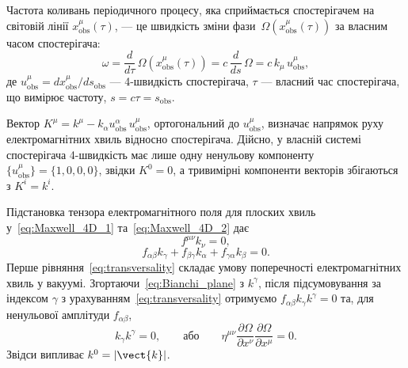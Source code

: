 Частота коливань періодичного процесу, яка сприймається спостерігачем на світовій лінії $x_{\text{obs}}^{\mu}(\tau)$, --- це швидкість зміни фази~$\Omega\!\left(x_{\text{obs}}^{\mu}(\tau)\right)$ за власним часом спостерігача:
\begin{equation}\label{eq:freq_observer}
    \omega = \frac{d}{d\tau}\,\Omega\!\left(x_{\text{obs}}^{\mu}(\tau)\right)
    = c\,\frac{d}{ds}\,\Omega = c\,k_{\mu}\,u_{\text{obs}}^{\mu},
\end{equation}
де $u_{\text{obs}}^{\mu}=dx_{\text{obs}}^{\mu}/ds_{\text{obs}}$ --- 4-швидкість спостерігача, $\tau$ --- власний час спостерігача, що вимірює частоту, $s=c\tau=s_{\text{obs}}$.

Вектор $K^{\mu}=k^{\mu}-k_{\alpha}u_{\text{obs}}^{\alpha}\,u_{\text{obs}}^{\mu}$, ортогональний до $u_{\text{obs}}^{\mu}$, визначає напрямок руху електромагнітних хвиль відносно спостерігача. Дійсно, у власній системі спостерігача 4-швидкість має лише одну ненульову компоненту $\{u_{\text{obs}}^{\mu}\}=\{1,0,0,0\}$, звідки $K^0=0$, а тривимірні компоненти векторів збігаються з $K^i=k^i$.

Підстановка тензора електромагнітного поля для плоских хвиль у~\eqref{eq:Maxwell_4D_1} та~\eqref{eq:Maxwell_4D_2} дає
\begin{equation}\label{eq:transversality}
    f^{\mu\nu}k_{\nu} = 0,
\end{equation}
\begin{equation}\label{eq:Bianchi_plane}
    f_{\alpha\beta}k_{\gamma} + f_{\beta\gamma}k_{\alpha} + f_{\gamma\alpha}k_{\beta} = 0.
\end{equation}
Перше рівняння~\eqref{eq:transversality} складає умову поперечності електромагнітних хвиль у вакуумі. Згортаючи~\eqref{eq:Bianchi_plane} з $k^{\gamma}$, після підсумовування за індексом $\gamma$ з урахуванням~\eqref{eq:transversality} отримуємо $f_{\alpha\beta}k_{\gamma}k^{\gamma}=0$ та, для ненульової амплітуди $f_{\alpha\beta}$,
\begin{equation}\label{eq:lightlike}
    k_{\gamma}k^{\gamma} = 0,
    \qquad\text{або}\qquad
    \eta^{\mu\nu}\frac{\partial\Omega}{\partial x^{\nu}}\frac{\partial\Omega}{\partial x^{\mu}} = 0.
\end{equation}
Звідси випливає $k^0=|\vect{k}|$.


